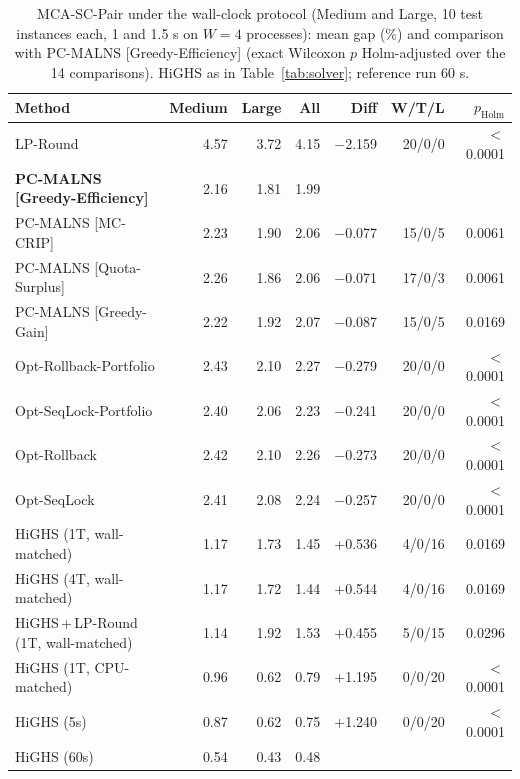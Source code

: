 \begin{table}[pos=!htb]
\centering
\caption{MCA-SC-Pair under the wall-clock protocol (Medium and Large, 10 test instances each, 1 and 1.5 s on $W = 4$ processes): mean gap (\%) and comparison with PC-MALNS [Greedy-Efficiency] (exact Wilcoxon $p$ Holm-adjusted over the 14 comparisons). HiGHS as in Table~\ref{tab:solver}; reference run 60 s.}
\label{tab:pair}
\scriptsize
\begin{tabular}{@{}lrrrrrr@{}}
\toprule
Method & Medium & Large & All & Diff & W/T/L & $p_{\text{Holm}}$ \\
\midrule
LP-Round & 4.57 & 3.72 & 4.15 & $-$2.159 & 20/0/0 & $<$0.0001 \\
\textbf{PC-MALNS [Greedy-Efficiency]} & 2.16 & 1.81 & 1.99 &  &  &  \\
\addlinespace
PC-MALNS [MC-CRIP] & 2.23 & 1.90 & 2.06 & $-$0.077 & 15/0/5 & 0.0061 \\
PC-MALNS [Quota-Surplus] & 2.26 & 1.86 & 2.06 & $-$0.071 & 17/0/3 & 0.0061 \\
PC-MALNS [Greedy-Gain] & 2.22 & 1.92 & 2.07 & $-$0.087 & 15/0/5 & 0.0169 \\
\addlinespace
Opt-Rollback-Portfolio & 2.43 & 2.10 & 2.27 & $-$0.279 & 20/0/0 & $<$0.0001 \\
Opt-SeqLock-Portfolio & 2.40 & 2.06 & 2.23 & $-$0.241 & 20/0/0 & $<$0.0001 \\
Opt-Rollback & 2.42 & 2.10 & 2.26 & $-$0.273 & 20/0/0 & $<$0.0001 \\
Opt-SeqLock & 2.41 & 2.08 & 2.24 & $-$0.257 & 20/0/0 & $<$0.0001 \\
\addlinespace
HiGHS (1T, wall-matched) & 1.17 & 1.73 & 1.45 & +0.536 & 4/0/16 & 0.0169 \\
HiGHS (4T, wall-matched) & 1.17 & 1.72 & 1.44 & +0.544 & 4/0/16 & 0.0169 \\
HiGHS\,+\,LP-Round (1T, wall-matched) & 1.14 & 1.92 & 1.53 & +0.455 & 5/0/15 & 0.0296 \\
HiGHS (1T, CPU-matched) & 0.96 & 0.62 & 0.79 & +1.195 & 0/0/20 & $<$0.0001 \\
HiGHS (5s) & 0.87 & 0.62 & 0.75 & +1.240 & 0/0/20 & $<$0.0001 \\
HiGHS (60s) & 0.54 & 0.43 & 0.48 &  &  &  \\
\bottomrule
\end{tabular}
\end{table}
